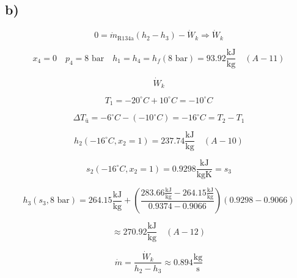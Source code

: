 

\subsection*{b)}

\[
0 = \dot{m}_{\text{R134a}} (h_2 - h_3) - \dot{W}_k \Rightarrow \dot{W}_k
\]

\[
x_4 = 0 \quad p_4 = 8 \text{ bar} \quad h_1 = h_4 = h_f(8 \text{ bar}) = 93.92 \frac{\text{kJ}}{\text{kg}} \quad (A-11)
\]

\[
\dot{W}_k
\]

\[
T_1 = -20^\circ C + 10^\circ C = -10^\circ C
\]

\[
\Delta T_{\text{ü}} = -6^\circ C - (-10^\circ C) = -16^\circ C = T_2 - T_1
\]

\[
h_2 (-16^\circ C, x_2 = 1) = 237.74 \frac{\text{kJ}}{\text{kg}} \quad (A-10)
\]

\[
s_2 (-16^\circ C, x_2 = 1) = 0.9298 \frac{\text{kJ}}{\text{kgK}} = s_3
\]

\[
h_3 (s_3, 8 \text{ bar}) = 264.15 \frac{\text{kJ}}{\text{kg}} + \left( \frac{283.66 \frac{\text{kJ}}{\text{kg}} - 264.15 \frac{\text{kJ}}{\text{kg}}}{0.9374 - 0.9066} \right) (0.9298 - 0.9066)
\]

\[
\approx 270.92 \frac{\text{kJ}}{\text{kg}} \quad (A-12)
\]

\[
\dot{m} = \frac{\dot{W}_k}{h_2 - h_3} \approx 0.894 \frac{\text{kg}}{\text{s}}
\]